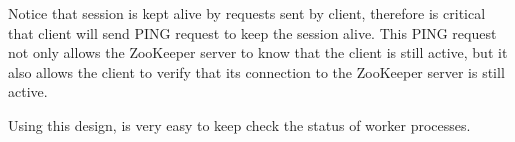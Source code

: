 \documentclass[sigchi]{acmart}
\begin{document}
Notice that session is kept alive by requests sent by client, therefore is critical that client will send PING request to keep the session alive. This PING request not only allows the ZooKeeper server to know that the client is still active, but it also allows the client to verify that its connection to the ZooKeeper server is still active.

Using this design, is very easy to keep check the status of worker processes.














\appendix
\end{document}
